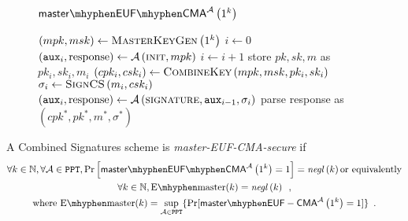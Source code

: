   \begin{figure}[!htbp]
    \begin{gamebox}{$\mathsf{master \mhyphen EUF \mhyphen
    CMA}^{\adversary}\left(1^k\right)$}
      \begin{algorithmic}[1]
        \State $\left(mpk, msk\right) \gets
        \textsc{MasterKeyGen}\left(1^k\right)$
        \State $i \gets 0$
        \State $\left(\mathtt{aux}_i, \mathrm{response}\right) \gets
        \mathcal{A}\left(\textsc{init}, mpk\right)$
          \State $i \gets i + 1$
          \State store $pk, sk, m$ as $pk_i, sk_i, m_i$
          \State $\left(cpk_i, csk_i\right) \gets
          \textsc{CombineKey}\left(mpk, msk, pk_i, sk_i\right)$
          \State $\sigma_i \gets \textsc{SignCS}\left(m_i, csk_i\right)$
          \State $\left(\mathtt{aux}_i, \mathrm{response}\right) \gets
          \mathcal{A}\left(\textsc{signature}, \mathtt{aux}_{i-1},
          \sigma_i\right)$
        \EndWhile
        \State parse response as $\left(cpk^*, pk^*, m^*, \sigma^*\right)$
          \State {}
        \Else
          \State {}
        \EndIf
      \end{algorithmic}
    \end{gamebox}
    \caption{}
    \label{game:comb:master}
  \end{figure}
  \begin{definition}
    \label{def:master:secure}
    A Combined Signatures scheme is \emph{\textsf{master-EUF-CMA}-secure} if
    \begin{gather*}
      \forall k \in \mathbb{N}, \forall \adversary \in \mathtt{PPT},
      \Pr\left[\mathsf{master \mhyphen EUF \mhyphen
      CMA}^{\adversary}\left(1^k\right) = 1\right] =
      \mathit{negl}\left(k\right) \text{or equivalently} \\
      \forall k \in \mathbb{N}, \mathrm{E \mhyphen master}(k) =
      \mathit{negl}\left(k\right) \enspace, \\
      \text{where } \mathrm{E \mhyphen master}(k) = \underset{\adversary \in
      \mathtt{PPT}}{\sup}\{\Pr[\mathsf{master \mhyphen
      EUF-CMA}^{\adversary}\left(1^k\right) = 1]\} \enspace.
    \end{gather*}
  \end{definition}

